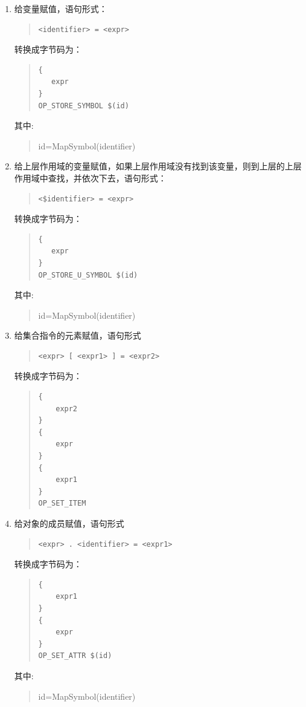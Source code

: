 \begin{enumerate}
\item 给变量赋值，语句形式：
\begin{quote}
\begin{verbatim}
<identifier> = <expr>
\end{verbatim}
\end{quote}
转换成字节码为：
\begin{quote}
\begin{verbatim}
{
   expr
}
OP_STORE_SYMBOL $(id)
\end{verbatim}
\end{quote}
其中:
\begin{quote}
id=MapSymbol(identifier)
\end{quote}
\item 给上层作用域的变量赋值，如果上层作用域没有找到该变量，则到上层的上层作用域中查找，并依次下去，语句形式：
\begin{quote}
\begin{verbatim}
<$identifier> = <expr>
\end{verbatim}
\end{quote}
转换成字节码为：
\begin{quote}
\begin{verbatim}
{
   expr
}
OP_STORE_U_SYMBOL $(id)
\end{verbatim}
\end{quote}
其中:
\begin{quote}
id=MapSymbol(identifier)
\end{quote}
\item 给集合指令的元素赋值，语句形式
\begin{quote}
\begin{verbatim}
<expr> [ <expr1> ] = <expr2>
\end{verbatim}
\end{quote}
转换成字节码为：
\begin{quote}
\begin{verbatim}
{
    expr2
}
{
    expr  
}
{
    expr1
}
OP_SET_ITEM
\end{verbatim}
\end{quote}
\item 给对象的成员赋值，语句形式
\begin{quote}
\begin{verbatim}
<expr> . <identifier> = <expr1>
\end{verbatim}
\end{quote}
转换成字节码为：
\begin{quote}
\begin{verbatim}
{
    expr1
}
{
    expr  
}
OP_SET_ATTR $(id)
\end{verbatim}
\end{quote}
其中:
\begin{quote}
id=MapSymbol(identifier)
\end{quote}
\end{enumerate}


